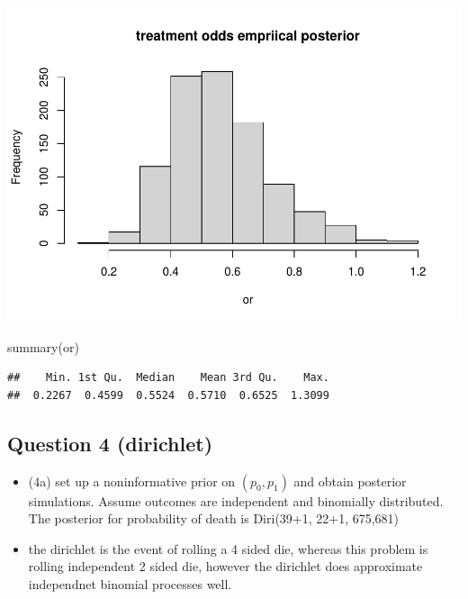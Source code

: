 \documentclass[
]{book}
\newenvironment{Shaded}{\begin{snugshade}}{\end{snugshade}}
\newcommand{\FunctionTok}[1]{\textcolor[rgb]{0.00,0.00,0.00}{#1}}
\newcommand{\NormalTok}[1]{#1}
\providecommand{\tightlist}{%
  \setlength{\itemsep}{0pt}\setlength{\parskip}{0pt}}
\theoremstyle{definition}
\theoremstyle{definition}
\theoremstyle{definition}
\theoremstyle{definition}
\theoremstyle{remark}
\begin{document}
\includegraphics{_main_files/figure-latex/unnamed-chunk-35-1.pdf}

\begin{Shaded}
\begin{Highlighting}[]
  \FunctionTok{summary}\NormalTok{(or)}
\end{Highlighting}
\end{Shaded}

\begin{verbatim}
##    Min. 1st Qu.  Median    Mean 3rd Qu.    Max. 
##  0.2267  0.4599  0.5524  0.5710  0.6525  1.3099
\end{verbatim}

\hypertarget{question-4-dirichlet}{%
\subsection*{Question 4 (dirichlet)}\label{question-4-dirichlet}}

\begin{itemize}
\tightlist
\item
  (4a) set up a noninformative prior on \((p_0,p_1)\) and obtain posterior simulations. Assume outcomes are independent and binomially distributed. The posterior for probability of death is Diri(39+1, 22+1, 675,681)
\item
  the dirichlet is the event of rolling a 4 sided die, whereas this problem is rolling independent 2 sided die, however the dirichlet does approximate independnet binomial processes well.
\end{itemize}
\end{document}
